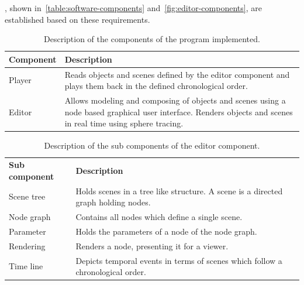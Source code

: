 \documentclass[%
    a4paper,    %
    justified,  %
    nobib,      %
    openany     %
]{tufte-book}
\makeatletter
\renewcommand{\label}[1]{\@tufte@label{##1}}%
\makeatother
\begin{document}
, shown in~\autoref{table:software-components}
and~\autoref{fig:editor-components}, are established based on these
requirements.

\begin{table}[h]
  \begin{tabularx}{\textwidth}{lX}
    \toprule
    \textbf{Component} & \textbf{Description} \\
    \midrule
    Player & Reads objects and scenes defined by the editor component and plays
    them back in the defined chronological order.\\
    \midrule
    Editor & Allows modeling and composing of objects and
    scenes using a node based graphical user interface. Renders objects
    and scenes in real time using sphere tracing. \\
    \bottomrule
  \end{tabularx}
  \caption{Description of the components of the program implemented.}
\label{table:software-components}
\end{table}

\begin{table}[h]
  \begin{tabularx}{\textwidth}{lX}
    \toprule
    \textbf{Sub component} & \textbf{Description} \\
    Scene tree & Holds scenes in a tree like structure. A scene is a directed
    graph holding nodes.                                           \\
    Node graph & Contains all nodes which define a single scene.   \\
    Parameter  & Holds the parameters of a node of the node graph. \\
    Rendering  & Renders a node, presenting it for a viewer.       \\
    Time line  & Depicts temporal events in terms of scenes which follow a
    chronological order.                                           \\
    \bottomrule
  \end{tabularx}
  \caption{Description of the sub components of the editor component.}
\label{table:editor:sub-components}
\end{table}
\end{document}
